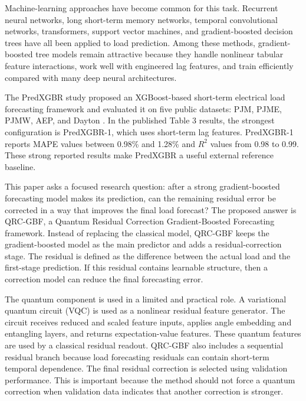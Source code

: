 \documentclass[11pt]{article}
\begin{document}
Machine-learning approaches have become common for this task. Recurrent neural networks, long short-term memory networks, temporal convolutional networks, transformers, support vector machines, and gradient-boosted decision trees have all been applied to load prediction. Among these methods, gradient-boosted tree models remain attractive because they handle nonlinear tabular feature interactions, work well with engineered lag features, and train efficiently compared with many deep neural architectures.

The PredXGBR study proposed an XGBoost-based short-term electrical load forecasting framework and evaluated it on five public datasets: PJM, PJME, PJMW, AEP, and Dayton \cite{zabin2024predxgbr}. In the published Table 3 results, the strongest configuration is PredXGBR-1, which uses short-term lag features. PredXGBR-1 reports MAPE values between 0.98\% and 1.28\% and $R^2$ values from 0.98 to 0.99. These strong reported results make PredXGBR a useful external reference baseline.

This paper asks a focused research question: after a strong gradient-boosted forecasting model makes its prediction, can the remaining residual error be corrected in a way that improves the final load forecast? The proposed answer is QRC-GBF, a Quantum Residual Correction Gradient-Boosted Forecasting framework. Instead of replacing the classical model, QRC-GBF keeps the gradient-boosted model as the main predictor and adds a residual-correction stage. The residual is defined as the difference between the actual load and the first-stage prediction. If this residual contains learnable structure, then a correction model can reduce the final forecasting error.

The quantum component is used in a limited and practical role. A variational quantum circuit (VQC) is used as a nonlinear residual feature generator. The circuit receives reduced and scaled feature inputs, applies angle embedding and entangling layers, and returns expectation-value features. These quantum features are used by a classical residual readout. QRC-GBF also includes a sequential residual branch because load forecasting residuals can contain short-term temporal dependence. The final residual correction is selected using validation performance. This is important because the method should not force a quantum correction when validation data indicates that another correction is stronger.
\end{document}
